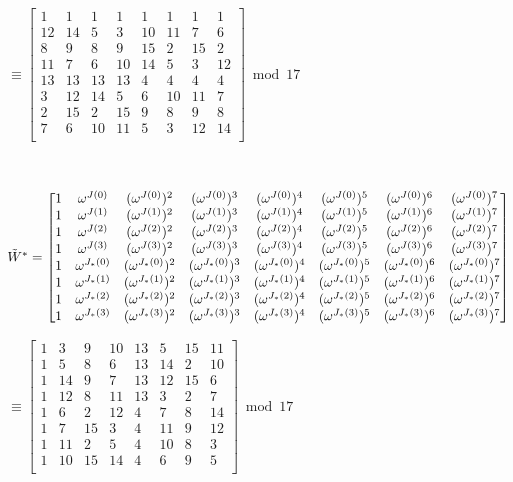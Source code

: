 $ \equiv \begin{bmatrix}
1 & 1 & 1 & 1 & 1 & 1 & 1 & 1\\
12&14&5&3&10&11&7&6\\
8&9&8&9&15&2&15&2\\
11&7&6&10&14&5&3&12\\
13&13&13&13&4&4&4&4\\
3&12&14&5&6&10&11&7\\
2&15&2&15&9&8&9&8\\
7&6&10&11&5&3&12&14\\
\end{bmatrix} \bmod{17}$ 

$ $ 

$\tilde{W}^* = \begin{bmatrix}
1 & \omega^{J(0)} & (\omega^{J(0)})^2 & (\omega^{J(0)})^3 & (\omega^{J(0)})^4 & (\omega^{J(0)})^5 & (\omega^{J(0)})^6 & (\omega^{J(0)})^7\\
1 & \omega^{J(1)} & (\omega^{J(1)})^2 & (\omega^{J(1)})^3 & (\omega^{J(1)})^4& (\omega^{J(1)})^5& (\omega^{J(1)})^6& (\omega^{J(1)})^7\\
1 & \omega^{J(2)} & (\omega^{J(2)})^2 & (\omega^{J(2)})^3 & (\omega^{J(2)})^4 & (\omega^{J(2)})^5 & (\omega^{J(2)})^6 & (\omega^{J(2)})^7\\
1 & \omega^{J(3)} & (\omega^{J(3)})^2 & (\omega^{J(3)})^3 & (\omega^{J(3)})^4& (\omega^{J(3)})^5& (\omega^{J(3)})^6& (\omega^{J(3)})^7\\
1 & \omega^{J_*(0)} & (\omega^{J_*(0)})^2 & (\omega^{J_*(0)})^3 & (\omega^{J_*(0)})^4 & (\omega^{J_*(0)})^5 & (\omega^{J_*(0)})^6 & (\omega^{J_*(0)})^7\\
1 & \omega^{J_*(1)} & (\omega^{J_*(1)})^2 & (\omega^{J_*(1)})^3 & (\omega^{J_*(1)})^4& (\omega^{J_*(1)})^5& (\omega^{J_*(1)})^6& (\omega^{J_*(1)})^7\\
1 & \omega^{J_*(2)} & (\omega^{J_*(2)})^2 & (\omega^{J_*(2)})^3 & (\omega^{J_*(2)})^4 & (\omega^{J_*(2)})^5 & (\omega^{J_*(2)})^6 & (\omega^{J_*(2)})^7\\
1 & \omega^{J_*(3)} & (\omega^{J_*(3)})^2 & (\omega^{J_*(3)})^3 & (\omega^{J_*(3)})^4& (\omega^{J_*(3)})^5& (\omega^{J_*(3)})^6& (\omega^{J_*(3)})^7\\
\end{bmatrix}$

$ \equiv \begin{bmatrix}
1&3&9&10&13&5&15&11\\
1&5&8&6&13&14&2&10\\
1&14&9&7&13&12&15&6\\
1&12&8&11&13&3&2&7\\
1&6&2&12&4&7&8&14\\
1&7&15&3&4&11&9&12\\
1&11&2&5&4&10&8&3\\
1&10&15&14&4&6&9&5\\
\end{bmatrix}  \bmod{17}$

